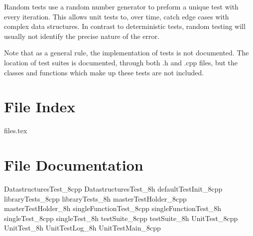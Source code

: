 	Random tests use a random number generator to preform a unique test with every iteration.  This allows unit tests to, over time, catch edge cases with complex data structures.  In contrast to deterministic tests, random testing will usually not identify the precise nature of the error.

	Note that as a general rule, the implementation of tests is not documented.  The location of test suites is documented, through both .h and .cpp files, but the classes and functions which make up these tests are not included.

	\renewcommand{\DOXYGENFOLDER}{../../UnitTest/Documentation/doxygenFiles/latex/}
	\chapter{File Index}
		{files.tex}
		
	\chapter{File Documentation}
		{DatastructuresTest_8cpp}
		{DatastructuresTest_8h}
		{defaultTestInit_8cpp}
		{libraryTests_8cpp}
		{libraryTests_8h}
		{masterTestHolder_8cpp}
		{masterTestHolder_8h}
		{singleFunctionTest_8cpp}
		{singleFunctionTest_8h}
		{singleTest_8cpp}
		{singleTest_8h}
		{testSuite_8cpp}
		{testSuite_8h}
		{UnitTest_8cpp}
		{UnitTest_8h}
		{UnitTestLog_8h}
		{UnitTestMain_8cpp}
		
